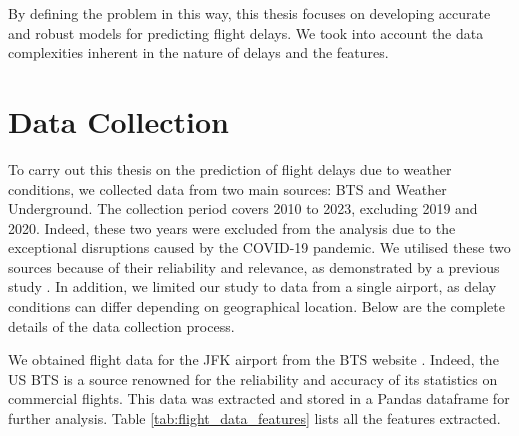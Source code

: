 \documentclass[12pt,oneside]{book} %
\begin{document}
\noindent By defining the problem in this way, this thesis focuses on developing accurate and robust models for predicting flight delays. We took into account the data complexities inherent in the nature of delays and the features.

\section{Data Collection}
\label{data_collection}

\noindent To carry out this thesis on the prediction of flight delays due to weather conditions, we collected data from two main sources: BTS and Weather Underground. The collection period covers 2010 to 2023, excluding 2019 and 2020. Indeed, these two years were excluded from the analysis due to the exceptional disruptions caused by the COVID-19 pandemic. We utilised these two sources because of their reliability and relevance, as demonstrated by a previous study \cite{kim}. In addition, we limited our study to data from a single airport, as delay conditions can differ depending on geographical location. Below are the complete details of the data collection process.

\noindent We obtained flight data for the JFK airport from the BTS website \cite{bts_datacollection}. Indeed, the US BTS is a source renowned for the reliability and accuracy of its statistics on commercial flights. This data was extracted and stored in a Pandas dataframe for further analysis. Table \ref{tab:flight_data_features} lists all the features extracted.
\end{document}

